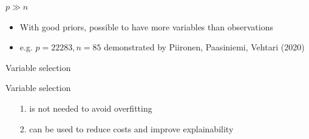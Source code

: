 \documentclass[english,t]{beamer}
\begin{document}
\begin{frame}{$p \gg n$}

  \begin{itemize}
  \item With good priors, possible to have more variables than observations
  \item e.g. $p=22283, n=85$ demonstrated by Piironen, Paasiniemi,
    Vehtari (2020)
  \end{itemize}
\end{frame}


\begin{frame}{Variable selection}
  
  Variable selection
  \begin{itemize}
  \item[1.] is not needed to avoid overfitting
  \item[2.] can be used to reduce costs and improve explainability
  \end{itemize}

\end{frame}
\end{document}
